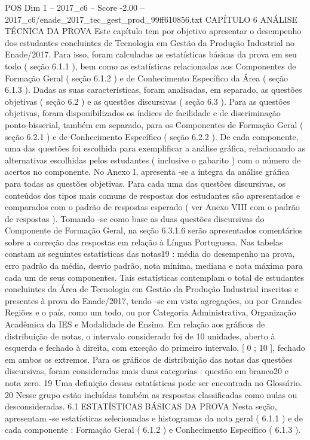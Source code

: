 \begin{textsample}{POS Dim 1 – 2017\_c6 – Score -2.00 – 2017\_c6/enade\_2017\_tec\_gest\_prod\_99ff610856.txt}  \label{ex:f1_pos_295}
CAPÍTULO 6 ANÁLISE TÉCNICA DA PROVA Este capítulo tem por objetivo apresentar o desempenho dos estudantes concluintes de Tecnologia em Gestão da Produção Industrial no Enade/2017.
Para isso, foram calculadas as estatísticas básicas da prova em seu todo ( seção 6.1.1 ), bem como as estatísticas relacionadas aos Componentes de Formação Geral ( seção 6.1.2 ) e de Conhecimento Específico da Área ( seção 6.1.3 ).
Dadas as suas características, foram analisadas, em separado, as questões objetivas ( seção 6.2 ) e as questões discursivas ( seção 6.3 ).
Para as questões objetivas, foram disponibilizados os índices de facilidade e de discriminação ponto-bisserial, também em separado, para os Componentes de Formação Geral ( seção 6.2.1 ) e de Conhecimento Específico ( seção 6.2.2 ).
De cada componente, uma das questões foi escolhida para exemplificar a análise gráfica, relacionando as alternativas escolhidas pelos estudantes ( inclusive o gabarito ) com o número de acertos no componente.
No Anexo I, apresenta -se a íntegra da análise gráfica para todas as questões objetivas.
Para cada uma das questões discursivas, os conteúdos dos tipos mais comuns de respostas dos estudantes são apresentados e comparados com o padrão de respostas esperado ( ver Anexo VIII com o padrão de respostas ).
Tomando -se como base as duas questões discursivas do Componente de Formação Geral, na seção 6.3.1.6 serão apresentados comentários sobre a correção das respostas em relação à Língua Portuguesa.
Nas tabelas constam as seguintes estatísticas das notas19 : média do desempenho na prova, erro padrão da média, desvio padrão, nota mínima, mediana e nota máxima para cada um de seus componentes.
Tais estatísticas contemplam o total de estudantes concluintes da Área de Tecnologia em Gestão da Produção Industrial inscritos e presentes à prova do Enade/2017, tendo -se em vista agregações, ou por Grandes Regiões e o país, como um todo, ou por Categoria Administrativa, Organização Acadêmica da IES e Modalidade de Ensino.
Em relação aos gráficos de distribuição de notas, o intervalo considerado foi de 10 unidades, aberto à esquerda e fechado à direita, com exceção do primeiro intervalo, [ 0 ; 10 ], fechado em ambos os extremos.
Para os gráficos de distribuição das notas das questões discursivas, foram consideradas mais duas categorias : questão em branco20 e nota zero. 19 Uma definição dessas estatísticas pode ser encontrada no Glossário. 20 Nesse grupo estão incluídas também as respostas classificadas como nulas ou desconsideradas. 6.1 ESTATÍSTICAS BÁSICAS DA PROVA Nesta seção, apresentam -se estatísticas selecionadas e histogramas da nota geral ( 6.1.1 ) e de cada componente : Formação Geral ( 6.1.2 ) e Conhecimento Específico ( 6.1.3 ).

\end{textsample}
